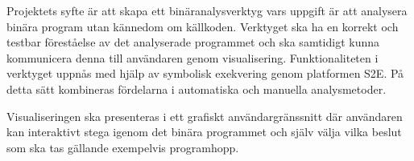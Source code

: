 Projektets syfte är att skapa ett binäranalysverktyg vars uppgift är att analysera binära program
utan kännedom om källkoden. Verktyget ska ha en korrekt och testbar föreståelse av det analyserade
programmet och ska samtidigt kunna kommunicera denna till användaren genom 
visualisering. Funktionaliteten i verktyget uppnås med hjälp av symbolisk exekvering genom
platformen S2E. På detta sätt kombineras fördelarna i automatiska och manuella analysmetoder.

Visualiseringen ska presenteras i ett grafiskt användargränssnitt där användaren
kan interaktivt stega igenom det binära programmet och själv välja vilka beslut
som ska tas gällande exempelvis programhopp. 


